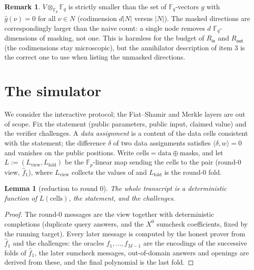 \documentclass{article}
\newcommand{\Fp}{\mathbb{F}_p}
\newcommand{\Fq}{\mathbb{F}_q}
\newcommand{\extdeg}{d}
\newtheorem{lemma}{Lemma}
\theoremstyle{definition}
\newtheorem{remark}{Remark}
\begin{document}
\begin{remark}
$V \otimes_{\Fp} \Fq$ is strictly smaller than the set of $\Fq$-vectors $g$ with $\hat{g}(\nu) = 0$ for all $\nu \in N$ (codimension $\extdeg |N|$ versus $|N|$). The masked directions are correspondingly larger than the naive count: a single node removes $\extdeg$ $\Fq$-dimensions of masking, not one. This is harmless for the budget of $R_{\mathsf{in}}$ and $R_{\mathsf{out}}$ (the codimensions stay microscopic), but the annihilator description of item 3 is the correct one to use when listing the unmasked directions.
\end{remark}

\section{The simulator}\label{sec:simulator}

We consider the interactive protocol; the Fiat--Shamir and Merkle layers are out of scope. Fix the statement (public parameters, public input, claimed value) and the verifier challenges. A \emph{data assignment} is a content of the data cells consistent with the statement; the difference $\delta$ of two data assignments satisfies $\langle \delta, w \rangle = 0$ and vanishes on the public positions. Write $\mathrm{cells} = \mathrm{data} \oplus \mathrm{masks}$, and let $L := (L_{\mathrm{view}}, L_{\mathrm{fold}})$ be the $\Fp$-linear map sending the cells to the pair (round-0 view, $\hat{f}_1$), where $L_{\mathrm{view}}$ collects the values of  and $L_{\mathrm{fold}}$ is the round-0 fold.

\begin{lemma}[reduction to round 0]\label{lem:reduction}
The whole transcript is a deterministic function of $L(\mathrm{cells})$, the statement, and the challenges.
\end{lemma}

\begin{proof}
The round-0 messages are the view together with deterministic completions (duplicate query answers, and the $X^0$ sumcheck coefficients, fixed by the running target). Every later message is computed by the honest prover from $\hat{f}_1$ and the challenges: the oracles $f_1, \dots, f_{M-1}$ are the encodings of the successive folds of $\hat{f}_1$, the later sumcheck messages, out-of-domain answers and openings are derived from these, and the final polynomial is the last fold.
\end{proof}
\end{document}
